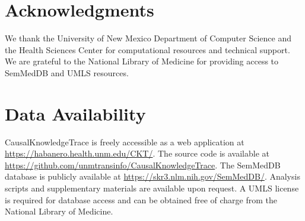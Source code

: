 \documentclass[preprint,12pt,numbers,sort&compress]{elsarticle}
\begin{document}
\section*{Acknowledgments}
We thank the University of New Mexico Department of Computer Science and the Health Sciences Center for computational resources and technical support. We are grateful to the National Library of Medicine for providing access to SemMedDB and UMLS resources.


\section*{Data Availability}
CausalKnowledgeTrace is freely accessible as a web application at \url{https://habanero.health.unm.edu/CKT/}. The source code is available at \url{https://github.com/unmtransinfo/CausalKnowledgeTrace}. The SemMedDB database is publicly available at \url{https://skr3.nlm.nih.gov/SemMedDB/}. Analysis scripts and supplementary materials are available upon request. A UMLS license is required for database access and can be obtained free of charge from the National Library of Medicine.




\end{document}
